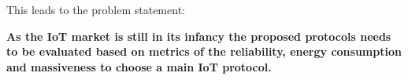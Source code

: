 
This leads to the problem statement:
\begin{center}
\textbf{As the IoT market is still in its infancy the proposed protocols needs to be evaluated based on metrics of the reliability, energy consumption and massiveness to choose a main IoT protocol.}
\end{center}

%


